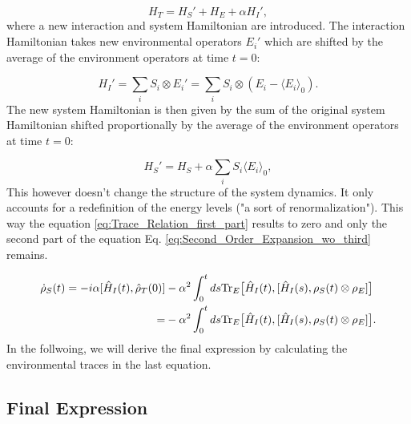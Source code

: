 \begin{equation}
    H_T = H_S' + H_E + \alpha H_I',
    \label{eq:Shifted_Total_Hamiltonian}
\end{equation}
where a new interaction and system Hamiltonian are introduced.
The interaction Hamiltonian takes new environmental operators $E_i'$ which are shifted by the average of the environment operators at time $t = 0$:

\begin{equation}
    H_I' = \sum_i S_i \otimes E_i' = \sum_i S_i \otimes (E_i - \langle E_i \rangle_0).
    \label{eq:Shifted_Interaction_Hamiltonian}
\end{equation}
The new system Hamiltonian is then given by the sum of the original system Hamiltonian shifted proportionally by the average of the environment operators at time $t = 0$:

\begin{equation}
    H_S' = H_S + \alpha \sum_i S_i \langle E_i \rangle_0,
    \label{eq:Shifted_System_Hamiltonian}
\end{equation}
This however doesn't change the structure of the system dynamics.
It only accounts for a redefinition of the energy levels ("a sort of renormalization").
This way the equation \eqref{eq:Trace_Relation_first_part} results to zero and only the second part of the equation Eq. \eqref{eq:Second_Order_Expansion_wo_third} remains.

\begin{align}
    \dot{\rho}_S(t) = -i \alpha [\hat{H}_I(t),\hat{\rho}_T(0)]
      & - \alpha^2 \int_0^t ds \mathrm{Tr}_E \big[\hat{H}_I(t), [\hat{H}_I(s), \rho_S(t) \otimes \rho_E]\big] \notag \\
    = & - \alpha^2 \int_0^t ds \mathrm{Tr}_E \big[\hat{H}_I(t), [\hat{H}_I(s), \rho_S(t) \otimes \rho_E]\big].
    \label{eq:Partial_Trace_Derivation}
\end{align}
In the follwoing, we will derive the final expression by calculating the environmental traces in the last equation.


\subsection{Final Expression}
\label{subsec:Final_Expression}

